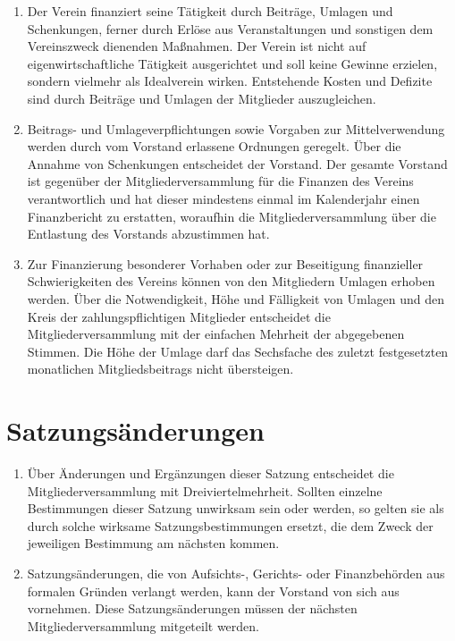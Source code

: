 \documentclass[a4paper, 10pt, headings=normal]{scrartcl}
\begin{document}
\begin{multicols}{2}
\begin{enumerate}[label={(\arabic*)}]
	\item
		Der Verein finanziert seine Tätigkeit durch Beiträge, Umlagen und Schenkungen, ferner durch Erlöse aus Veranstaltungen und sonstigen dem Vereinszweck dienenden Maßnahmen.
		Der Verein ist nicht auf eigenwirtschaftliche Tätigkeit ausgerichtet und soll keine Gewinne erzielen, sondern vielmehr als Idealverein wirken.
		Entstehende Kosten und Defizite sind durch Beiträge und Umlagen der Mitglieder auszugleichen.
	\item
		Beitrags- und Umlageverpflichtungen sowie Vorgaben zur Mittelverwendung werden durch vom Vorstand erlassene Ordnungen geregelt.
		Über die Annahme von Schenkungen entscheidet der Vorstand.
		Der gesamte Vorstand ist gegenüber der Mitgliederversammlung für die Finanzen des Vereins verantwortlich und hat dieser mindestens einmal im Kalenderjahr einen Finanzbericht zu erstatten, woraufhin die Mitgliederversammlung über die Entlastung des Vorstands abzustimmen hat.
	\item
		Zur Finanzierung besonderer Vorhaben oder zur Beseitigung finanzieller Schwierigkeiten des Vereins können von den Mitgliedern Umlagen erhoben werden.
		Über die Notwendigkeit, Höhe und Fälligkeit von Umlagen und den Kreis der zahlungspflichtigen Mitglieder entscheidet die Mitgliederversammlung mit der einfachen Mehrheit der abgegebenen Stimmen.
		Die Höhe der Umlage darf das Sechsfache des zuletzt festgesetzten monatlichen Mitgliedsbeitrags nicht übersteigen.
\end{enumerate}

\section{Satzungsänderungen}
\label{par:satzungsaenderungen}

\begin{enumerate}[label={(\arabic*)}]
	\item
		Über Änderungen und Ergänzungen dieser Satzung entscheidet die Mitgliederversammlung mit Dreiviertelmehrheit.
		Sollten einzelne Bestimmungen dieser Satzung unwirksam sein oder werden, so gelten sie als durch solche wirksame Satzungsbestimmungen ersetzt, die dem Zweck der jeweiligen Bestimmung am nächsten kommen.
	\item
		Satzungsänderungen, die von Aufsichts\mbox{-,} Gerichts- oder Finanzbehörden aus formalen Gründen verlangt werden, kann der Vorstand von sich aus vornehmen.
		Diese Satzungsänderungen müssen der nächsten Mitgliederversammlung mitgeteilt werden.
\end{enumerate}


\end{multicols}
\end{document}
